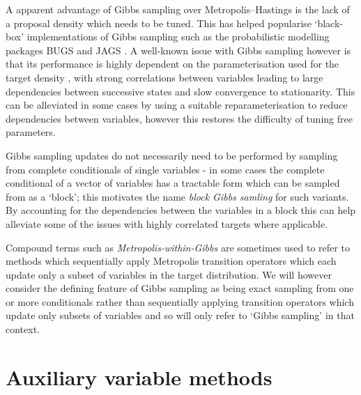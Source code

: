 A apparent advantage of Gibbs sampling over Metropolis--Hastings is the lack of a proposal density which needs to be tuned. This has helped popularise `black-box' implementations of Gibbs sampling such as the probabilistic modelling packages BUGS \citep{gilks1994language} and JAGS \citep{plummer2003jags}. A well-known issue with Gibbs sampling however is that its performance is highly dependent on the parameterisation used for the target density \citep{raftery1991many}, with strong correlations between variables leading to large dependencies between successive states and slow convergence to stationarity. This can be alleviated in some cases by using a suitable reparameterisation to reduce dependencies between variables, however this restores the difficulty of tuning free parameters.

Gibbs sampling updates do not necessarily need to be performed by sampling from complete conditionals of single variables - in some cases the complete conditional of a vector of variables has a tractable form which can be sampled from as a `block'; this motivates the name \emph{block Gibbs samling} for such variants. By accounting for the dependencies between the variables in a block this can help alleviate some of the issues with highly correlated targets where applicable.

Compound terms such as \emph{Metropolis-within-Gibbs} are sometimes used to refer to methods which sequentially apply Metropolis transition operators which each update only a subset of variables in the target distribution. We will however consider the defining feature of Gibbs sampling as being exact sampling from one or more conditionals rather than sequentially applying transition operators which update only subsets of variables and so will only refer to `Gibbs sampling' in that context.

\section{Auxiliary variable methods}


